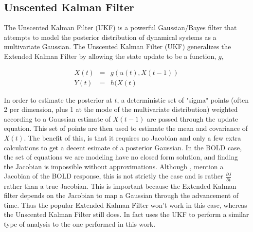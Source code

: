 \subsection{Unscented Kalman Filter}
\label{sec:Unscented Kalman Filter}
The Unscented Kalman Filter (UKF) is a powerful Gaussian/Bayes filter that attempts
to model the posterior distribution of dynamical systems as a multivariate
Gaussian. The Unscented Kalman Filter (UKF) generalizes the Extended Kalman
Filter by allowing the state update to be a function, $g$,

\begin{eqnarray}
X(t) &=& g(u(t), X(t-1))\\
Y(t) &=& h(X(t)
\end{eqnarray}

In order to estimate the posterior at $t$, a deterministic set of "sigma" points 
(often 2 per dimension, plus 1 at the mode of the multivariate distribution)
weighted according to a Gaussian estimate of $X(t-1)$ are passed through
the update equation. This set of points are then used to estimate the 
mean and covariance of $X(t)$. The benefit of this, is that it requires
no Jacobian and only a few extra calculations to get a decent esimate of
a posterior Gaussian. In the BOLD case, the set of equations we are modeling have no 
closed form solution, and finding the Jacobian is impossible without approximations. Although 
\cite{Riera2004}, \cite{Hu2009} mention a Jacobian of the BOLD response, this is
not strictly the case and is rather $\frac{\partial J}{\partial t}$
rather than a true Jacobian.  This is important because the Extended
Kalman filter depends on the Jacobian to map a Gaussian through the 
advancement of time. Thus the popular Extended Kalman Filter won't work
in this case, whereas the Unscented Kalman Filter still does. In fact
\cite{Hu2009} uses the UKF to perform a similar type of analysis to
the one performed in this work. 

